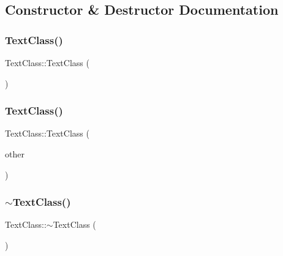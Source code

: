 \subsection{Constructor \& Destructor Documentation}
\mbox{\label{class_text_class_a0e96e63bbc5b8daaff57f836852532df}} 
\subsubsection{\texorpdfstring{Text\+Class()}{TextClass()}\hspace{0.1cm}{\footnotesize\ttfamily [1/2]}}
{\footnotesize\ttfamily Text\+Class\+::\+Text\+Class (\begin{DoxyParamCaption}{ }\end{DoxyParamCaption})}

\mbox{\label{class_text_class_ac83be4860da5842fe856495ef79d067f}} 
\subsubsection{\texorpdfstring{Text\+Class()}{TextClass()}\hspace{0.1cm}{\footnotesize\ttfamily [2/2]}}
{\footnotesize\ttfamily Text\+Class\+::\+Text\+Class (\begin{DoxyParamCaption}\item[{const \hyperlink{class_text_class}{Text\+Class} \&}]{other }\end{DoxyParamCaption})}

\mbox{\label{class_text_class_a4abf419d6357da79d5e1e6a5eb64e13e}} 
\subsubsection{\texorpdfstring{$\sim$\+Text\+Class()}{~TextClass()}}
{\footnotesize\ttfamily Text\+Class\+::$\sim$\+Text\+Class (\begin{DoxyParamCaption}{ }\end{DoxyParamCaption})}



